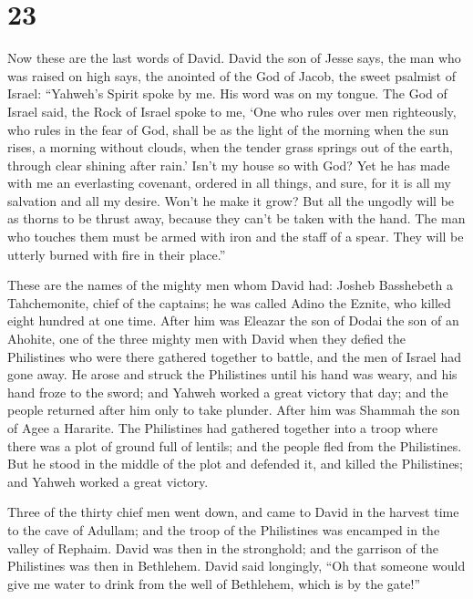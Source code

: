 \hypertarget{section-22}{%
\section{23}\label{section-22}}

 Now these are the last words of David. David the son of
Jesse says, the man who was raised on high says, the anointed of the God
of Jacob, the sweet psalmist of Israel:  ``Yahweh's Spirit
spoke by me. His word was on my tongue.  The God of Israel
said, the Rock of Israel spoke to me, `One who rules over men
righteously, who rules in the fear of God,  shall be as the
light of the morning when the sun rises, a morning without clouds, when
the tender grass springs out of the earth, through clear shining after
rain.'  Isn't my house so with God? Yet he has made with me
an everlasting covenant, ordered in all things, and sure, for it is all
my salvation and all my desire. Won't he make it grow?  But
all the ungodly will be as thorns to be thrust away, because they can't
be taken with the hand.  The man who touches them must be
armed with iron and the staff of a spear. They will be utterly burned
with fire in their place.''

 These are the names of the mighty men whom David had:
Josheb Basshebeth a Tahchemonite, chief of the captains; he was called
Adino the Eznite, who killed eight hundred at one time. 
After him was Eleazar the son of Dodai the son of an Ahohite, one of the
three mighty men with David when they defied the Philistines who were
there gathered together to battle, and the men of Israel had gone away.
 He arose and struck the Philistines until his hand was
weary, and his hand froze to the sword; and Yahweh worked a great
victory that day; and the people returned after him only to take
plunder.  After him was Shammah the son of Agee a Hararite.
The Philistines had gathered together into a troop where there was a
plot of ground full of lentils; and the people fled from the
Philistines.  But he stood in the middle of the plot and
defended it, and killed the Philistines; and Yahweh worked a great
victory.

 Three of the thirty chief men went down, and came to David
in the harvest time to the cave of Adullam; and the troop of the
Philistines was encamped in the valley of Rephaim.  David
was then in the stronghold; and the garrison of the Philistines was then
in Bethlehem.  David said longingly, ``Oh that someone
would give me water to drink from the well of Bethlehem, which is by the
gate!''

